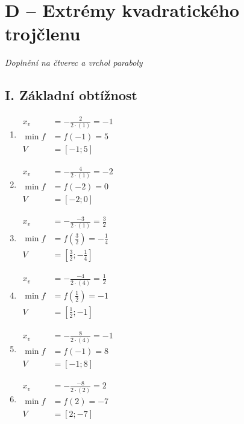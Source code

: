 \documentclass[11pt,a4paper]{article}
\begin{document}
\section*{D -- Extrémy kvadratického trojčlenu}
\textit{Doplnění na čtverec a vrchol paraboly}
\subsection*{I. Základní obtížnost}
\begin{enumerate}[label={},itemsep=9pt]
\item[\textbf{D001}] \(\displaystyle \begin{aligned}x_v&=-\frac{2}{2\cdot(1)}=-1\\\min f&=f(-1)=5\\V&=[-1;5]\end{aligned}\)\par
\item[\textbf{D002}] \(\displaystyle \begin{aligned}x_v&=-\frac{4}{2\cdot(1)}=-2\\\min f&=f(-2)=0\\V&=[-2;0]\end{aligned}\)\par
\item[\textbf{D003}] \(\displaystyle \begin{aligned}x_v&=-\frac{-3}{2\cdot(1)}=\frac{3}{2}\\\min f&=f(\frac{3}{2})=- \frac{1}{4}\\V&=[\frac{3}{2};- \frac{1}{4}]\end{aligned}\)\par
\item[\textbf{D004}] \(\displaystyle \begin{aligned}x_v&=-\frac{-4}{2\cdot(4)}=\frac{1}{2}\\\min f&=f(\frac{1}{2})=-1\\V&=[\frac{1}{2};-1]\end{aligned}\)\par
\item[\textbf{D005}] \(\displaystyle \begin{aligned}x_v&=-\frac{8}{2\cdot(4)}=-1\\\min f&=f(-1)=8\\V&=[-1;8]\end{aligned}\)\par
\item[\textbf{D006}] \(\displaystyle \begin{aligned}x_v&=-\frac{-8}{2\cdot(2)}=2\\\min f&=f(2)=-7\\V&=[2;-7]\end{aligned}\)\par

\end{enumerate}
\end{document}
